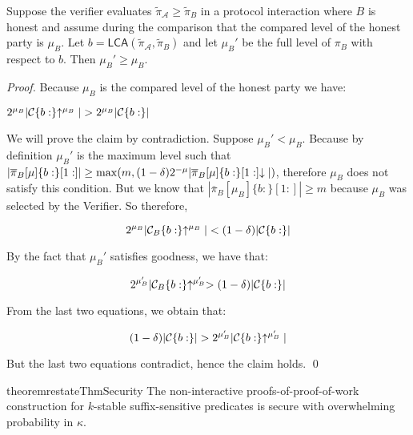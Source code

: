 \begin{lemma}
Suppose the verifier evaluates $\tilde\pi_\mathcal{A} \geq \tilde\pi_B$ in a protocol interaction where $B$ is honest and assume during the comparison that the compared level of the honest party is $\mu_B$.
Let $b = \textsf{LCA}(\tilde\pi_\mathcal{A}, \tilde\pi_B)$ and
let $\mu_B'$ be the full level of $\pi_B$ with respect to $b$.
Then $\mu_B' \geq \mu_B$.
\end{lemma}
\begin{proof}
    Because $\mu_B$ is the compared level of the honest party we have:

    $2^{\mu_B}|\mathcal{C}\{b:\}\negthickspace\uparrow^{\mu_B}| > 2^{\mu_B}|\mathcal{C}\{b:\}|$

    We will prove the claim by contradiction. Suppose $\mu_B' < \mu_B$. Because
    by definition $\mu_B'$ is the maximum level such that
    $|\overline\pi_B[\mu]\{b:\}[1:]| \geq \max(m, (1 -
    \delta)2^{-\mu}|\overline\pi_B[\mu]\{b:\}[1:]\negthickspace\downarrow|)$, therefore
    $\mu_B$ does not satisfy this condition. But we know that
    $|\overline\pi_B[\mu_B]\{b:\}[1:]| \geq m$ because $\mu_B$ was selected by
    the Verifier. So therefore,

    \begin{equation*}
    2^{\mu_B}|\mathcal{C}_B\{b:\}\negthickspace\uparrow^{\mu_B}| < (1 - \delta)|\mathcal{C}\{b:\}|
    \end{equation*}

    By the fact that $\mu_B'$ satisfies goodness, we have that:

    \begin{equation*}
    2^{\mu_B'}|\mathcal{C}_B\{b:\}\negthickspace\uparrow^{\mu_B'} > (1 - \delta)|\mathcal{C}\{b:\}|
    \end{equation*}

    From the last two equations, we obtain that:

    \begin{equation*}
    (1 - \delta)|\mathcal{C}\{b:\}| > 2^{\mu_B'}|\mathcal{C}\{b:\}\negthickspace\uparrow^{\mu_B'}|
    \end{equation*}

    But the last two equations contradict, hence the claim holds.
    \qed
\end{proof}

\begin{restatable}{theorem}{restateThmSecurity}
    \label{thm.security}
    The non-interactive proofs-of-proof-of-work construction for $k$-stable
    suffix-sensitive predicates is secure with overwhelming probability in
    $\kappa$.
\end{restatable}

